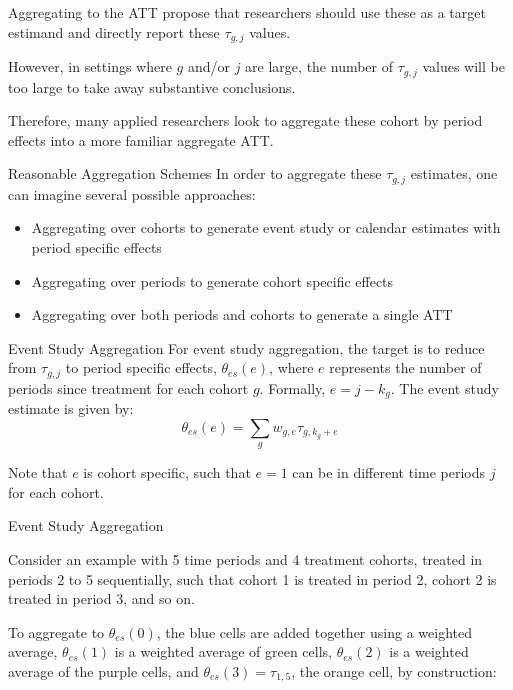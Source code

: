 \documentclass[11pt]{beamer}
\begin{document}
\begin{frame}{Aggregating to the ATT}    
    \textcite{callaway2021difference} propose that researchers should use these as a target estimand and directly report these $\tau_{g,j}$ values. 

    \vspace{2.5mm}
    
    However, in settings where $g$ and/or $j$ are large, the number of $\tau_{g,j}$ values will be too large to take away substantive conclusions. 
    
\vspace{2.5mm}
    
    Therefore, many applied researchers look to aggregate these cohort by period effects into a more familiar aggregate ATT.
\end{frame}


\begin{frame}{Reasonable Aggregation Schemes}
    In order to aggregate these $\tau_{g,j}$ estimates, one can imagine several possible approaches:

    \begin{itemize}
        \item Aggregating over cohorts to generate event study or calendar estimates with period specific effects
        \item Aggregating over periods to generate cohort specific effects
        \item Aggregating over both periods and cohorts to generate a single ATT
    \end{itemize}
\end{frame}


\begin{frame}{Event Study Aggregation}
    For event study aggregation, the target is to reduce from $\tau_{g,j}$ to period specific effects, $\theta_{es}(e)$, where $e$ represents the number of periods since treatment for each cohort $g$. Formally, $e = j - k_g$. The event study estimate is given by:
    \begin{equation}
        \theta_{es}(e) = \sum_g w_{g,e} \tau_{g,k_g+e}
    \end{equation}

    Note that $e$ is cohort specific, such that $e = 1$ can be in different time periods $j$ for each cohort. 
\end{frame}

\begin{frame}{Event Study Aggregation}

    Consider an example with 5 time periods and 4 treatment cohorts, treated in periods 2 to 5 sequentially, such that cohort 1 is treated in period 2, cohort 2 is treated in period 3, and so on.

    \vspace{2.5mm}
    To aggregate to $\theta_{es}(0)$, the blue cells are added together using a weighted average, $\theta_{es}(1)$ is a weighted average of green cells, $\theta_{es}(2)$ is a weighted average of the purple cells, and $\theta_{es}(3) = \tau_{1,5}$, the orange cell, by construction:

    
\end{frame}
\end{document}
